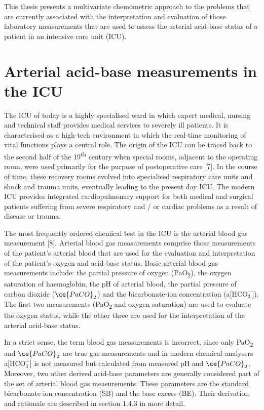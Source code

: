 \documentclass[
  12pt,
  a4paperpaper,
]{report}
\begin{document}
This thesis presents a multivariate chemometric approach to the problems
that are currently associated with the interpretation and evaluation of
those laboratory measurements that are used to assess the arterial
acid-base status of a patient in an intensive care unit (ICU).

\hypertarget{arterial-acid-base-measurements-in-the-icu}{%
\section{Arterial acid-base measurements in the
ICU}\label{arterial-acid-base-measurements-in-the-icu}}

The ICU of today is a highly specialised ward in which expert medical,
nursing and technical staff provides medical services to severely ill
patients. It is characterised as a high-tech environment in which the
real-time monitoring of vital functions plays a central role. The origin
of the ICU can be traced back to the second half of the
19\textsuperscript{th} century when special rooms, adjacent to the
operating room, were used primarily for the purpose of postoperative
care {[}7{]}. In the course of time, these recovery rooms evolved into
specialised respiratory care units and shock and trauma units,
eventually leading to the present day ICU. The modern ICU provides
integrated cardiopulmonary support for both medical and surgical
patients suffering from severe respiratory and / or cardiac problems as
a result of disease or trauma.

The most frequently ordered chemical test in the ICU is the arterial
blood gas measurement {[}8{]}. Arterial blood gas measurements comprise
those measurements of the patient's arterial blood that are used for the
evaluation and interpretation of the patient's oxygen and acid-base
status. Basic arterial blood gas measurements include: the partial
pressure of oxygen (PaO\textsubscript{2}), the oxygen saturation of
haemoglobin, the pH of arterial blood, the partial pressure of carbon
dioxide (\(\ce{PaCO}_{2}\)) and the bicarbonate-ion concentration
(a{[}\(\text{HCO}_{3}^{-}\){]}). The first two measurements
(PaO\textsubscript{2} and oxygen saturation) are used to evaluate the
oxygen status, while the other three are used for the interpretation of
the arterial acid-base status.

In a strict sense, the term blood gas measurements is incorrect, since
only PaO\textsubscript{2} and \(\ce{PaCO}_{2}\) are true gas
measurements and in modern chemical analysers
a{[}\(\text{HCO}_{3}^{-}\){]} is not measured but calculated from
measured pH and \(\ce{PaCO}_{2}\). Moreover, two other derived acid-base
parameters are generally considered part of the set of arterial blood
gas measurements. These parameters are the standard bicarbonate-ion
concentration (SB) and the base excess (BE). Their derivation and
rationale are described in section 1.4.3 in more detail.
\end{document}
